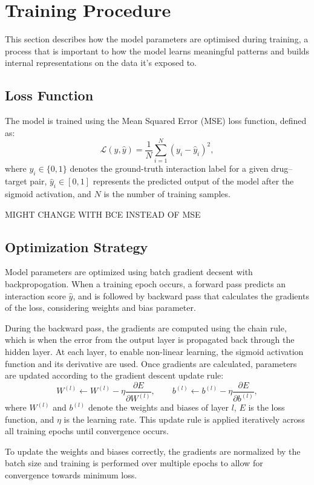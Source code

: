 \section{Training Procedure}
This section describes how the model parameters are optimised during training, a process that is important to how the model learns meaningful patterns and builds internal representations on the data it's exposed to.
\subsection{Loss Function}
The model is trained using the Mean Squared Error (MSE) loss function, defined as:
\[
\mathcal{L}(y, \hat{y}) = \frac{1}{N} \sum_{i=1}^{N} (y_i - \hat{y}_i)^2,
\]
where $y_i \in \{0,1\}$ denotes the ground-truth interaction label for a given drug--target pair, $\hat{y}_i \in [0,1]$ represents the predicted output of the model after the sigmoid activation, and $N$ is the number of training samples.

MIGHT CHANGE WITH BCE INSTEAD OF MSE
\subsection{Optimization Strategy}
Model parameters are optimized using batch gradient decsent with backpropogation. When a training epoch occurs, a forward pass predicts an interaction score $\hat{y}$, and is followed by backward pass that calculates the gradients of the loss, considering weights and bias parameter.

During the backward pass, the gradients are computed using the chain rule, which is when the error from the output layer is propagated back through the hidden layer. At each layer, to enable non-linear learning, the sigmoid activation function and its derivative are used. Once gradients are calculated, parameters are updated according to the gradient descent update rule:
\[
W^{(l)} \leftarrow W^{(l)} - \eta \frac{\partial E}{\partial W^{(l)}}, \qquad
b^{(l)} \leftarrow b^{(l)} - \eta \frac{\partial E}{\partial b^{(l)}},
\]
where $W^{(l)}$ and $b^{(l)}$ denote the weights and biases of layer $l$, $E$ is the loss function, and $\eta$ is the learning rate. This update rule is applied iteratively across all training epochs until convergence occurs.

To update the weights and biases correctly, the gradients are normalized by the batch size and training is performed over multiple epochs to allow for convergence towards minimum loss.
